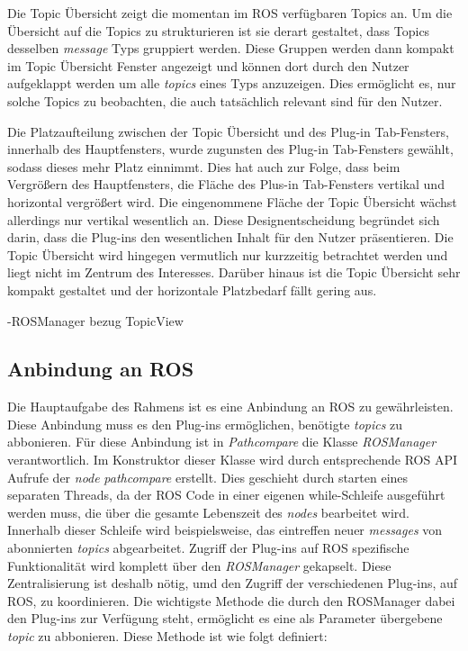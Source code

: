 Die Topic Übersicht zeigt die momentan im \gls{ROS} verfügbaren Topics an. 
Um die Übersicht auf die Topics zu strukturieren ist sie derart
gestaltet, dass Topics desselben \textit{message} Typs gruppiert werden. Diese
Gruppen werden dann kompakt im Topic Übersicht Fenster angezeigt und können dort durch
den Nutzer aufgeklappt werden um alle \textit{topics} eines Typs anzuzeigen.
Dies ermöglicht es, nur solche Topics zu beobachten, die auch
tatsächlich relevant sind für den Nutzer. 

Die Platzaufteilung zwischen der Topic Übersicht und des Plug-in Tab-Fensters,
innerhalb des Hauptfensters, wurde zugunsten des Plug-in Tab-Fensters gewählt,
sodass dieses mehr Platz einnimmt.  Dies hat auch zur Folge, dass beim Vergrößern
des Hauptfensters, die Fläche des Plus-in Tab-Fensters vertikal und horizontal
vergrößert wird. Die eingenommene Fläche der Topic Übersicht wächst allerdings
nur vertikal wesentlich an. Diese Designentscheidung begründet sich darin,
dass die Plug-ins den wesentlichen Inhalt für den Nutzer präsentieren. Die
Topic Übersicht wird hingegen vermutlich nur kurzzeitig betrachtet werden und
liegt nicht im Zentrum des Interesses. Darüber hinaus ist die Topic Übersicht
sehr kompakt gestaltet und der horizontale Platzbedarf fällt gering aus.

-ROSManager bezug TopicView

\subsection{Anbindung an ROS}

Die Hauptaufgabe des Rahmens ist es eine Anbindung an ROS zu gewährleisten.
Diese Anbindung muss es den Plug-ins ermöglichen, benötigte \textit{topics} zu
abbonieren. Für diese Anbindung ist in \textit{Pathcompare} die Klasse
\textit{ROSManager} verantwortlich. Im Konstruktor dieser Klasse wird durch
entsprechende \gls{ROS} API Aufrufe der \textit{node} \textit{pathcompare}
erstellt. Dies geschieht durch starten eines separaten Threads, da der ROS Code
in einer eigenen while-Schleife ausgeführt werden muss, die über die gesamte
Lebenszeit des \textit{nodes} bearbeitet wird. Innerhalb dieser Schleife wird
beispielsweise, das eintreffen neuer \textit{messages} von abonnierten
\textit{topics} abgearbeitet.
Zugriff der Plug-ins auf ROS spezifische Funktionalität wird komplett über den
\textit{ROSManager} gekapselt. Diese Zentralisierung ist deshalb nötig, umd den Zugriff
der verschiedenen Plug-ins, auf ROS, zu koordinieren. 
Die wichtigste Methode die durch den ROSManager dabei den Plug-ins zur
Verfügung steht, ermöglicht es eine als Parameter übergebene \textit{topic} zu
abbonieren. 
Diese Methode ist wie folgt definiert:

